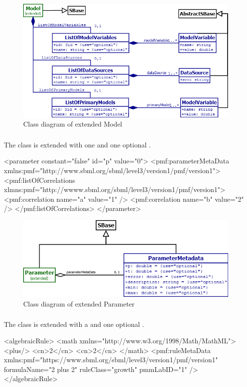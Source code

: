\begin{figure}
	\includegraphics[scale=0.7]{img/model_uml}
	\caption{Class diagram of extended Model}
	\label{model_uml}
\end{figure}

\subsubsection{}
The \Parameter class is extended with one \ListOfCorrelations and one optional
\ParameterMetaData.

\begin{example}
<parameter constant="false" id="p" value="0">
  <pmf:parameterMetaData xmlns:pmf="http://www.sbml.org/sbml/level3/version1/pmf/version1">
  <pmf:listOfCorrelations xlmns:pmf="http://wwww.sbml.org/sbml/level3/version1/pmf/version1">
    <pmf:correlation name="a" value="1" />
    <pmf:correlation name="b" value="2" />
  </pmf:listOfCorrelations>
</parameter>
\end{example}

\begin{figure}
	\includegraphics[scale=0.7]{img/parameter_uml}
	\caption{Class diagram of extended Parameter}
	\label{parameter_uml}
\end{figure}

\subsubsection{}
The \Rule class is extended with a \ListOfReferences and one optional
\RuleMetaData.
\begin{example}
<algebraicRule>
  <math xmlns="http://www.w3.org/1998/Math/MathML">
    <plus/>
    <cn>2</cn>
    <cn>2</cn>
  </math>
  <pmf:ruleMetaData xmlns:pmf="https://www.sbml.org/sbml/level3/version1/pmf/version1"
    formulaName="2 plus 2" ruleClass="growth" pmmLabID="1" />
</algebraicRule>
\end{example}

